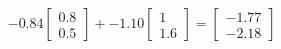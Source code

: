 \documentclass[preview]{standalone}
\begin{document}
\begin{align*}
-0.84 \begin{bmatrix} 0.8 \\ 0.5 \end{bmatrix} + -1.10 \begin{bmatrix} 1 \\ 1.6 \end{bmatrix} = \begin{bmatrix} -1.77 \\ -2.18 \end{bmatrix}
\end{align*}
\end{document}
